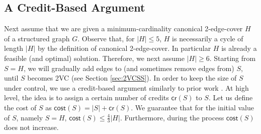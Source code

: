 \documentclass{article}
\newcommand{\cost}{\mathsf{cost}}
\newcommand{\credit}{\mathsf{cr}}
\begin{document}
\subsection{A Credit-Based Argument}
\label{sec:overview:credits}

Next assume that we are given a minimum-cardinality canonical 2-edge-cover $H$ of a structured graph $G$. Observe that, for $|H|\leq 5$, $H$ is necessarily a cycle of length $|H|$ by the definition of canonical 2-edge-cover. In particular $H$ is already a feasible (and optimal) solution. Therefore, we next assume $|H|\geq 6$. Starting from $S=H$, we will gradually add edges to (and sometimes remove edges from) $S$, until $S$ becomes 2VC (see Section \ref{sec:2VCSS}). In order to keep the size of $S$ under control, we use a credit-based argument similarly to prior work \cite{CDGKN20,GGJ23,GJT22}. At high level, the idea is to assign a certain number of credits $\credit(S)$ to $S$. Let us define the cost of $S$ as $\cost(S)=|S|+\credit(S)$. We guarantee that for the initial value of $S$, namely $S=H$, $\cost(S)\leq \frac{4}{3}|H|$. Furthermore, during the process $\cost(S)$ does not increase. 
\end{document}
